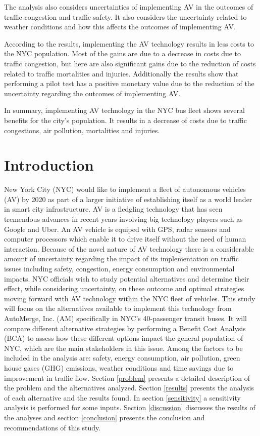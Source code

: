\documentclass[11pt, letterpaper]{article}
\begin{document}
The analysis also considers uncertainties of implementing AV in the outcomes of traffic congestion and
traffic safety. It also considers the uncertainty related to weather conditions and how this affects the outcomes
of implementing AV.

According to the results, implementing the AV technology results in less costs to the NYC population.
Most of the gains are due to a decrease in costs due to traffic congestion, but here are also significant gains 
due to the reduction of costs related to traffic mortalities and injuries. Additionally the results show that 
performing a pilot test has a positive monetary value due to the reduction of the uncertainty regarding the 
outcomes of implementing AV.

In summary, implementing AV technology in the NYC bus fleet shows several benefits for the city's population. It results
in a decrease of costs due to traffic congestions, air pollution, mortalities and injuries.


\pagebreak
\section{Introduction} \label{intro}

New York City (NYC) would like to implement a fleet of autonomous
vehicles (AV) by 2020 as part of a larger initiative of establishing
itself as a world leader in smart city infrastructure. AV is a fledgling technology
that has seen tremendous advances in recent years involving
big technology players such as Google and Uber. An AV vehicle is equiped with
GPS, radar sensors and computer processors which enable it to drive itself without the
need of human interaction. Because of the
novel nature of AV technology there is a considerable amount of
uncertainty regarding the impact of its implementation on traffic
issues including safety, congestion, energy consumption and environmental impacts.
NYC officials wish to study potential alternatives and determine their effect, while
considering uncertainty, on these outcome
and optimal strategies moving forward with AV
technology within the NYC fleet of vehicles. This study will focus on
the alternatives available to implement  this technology
from AutoMerge, Inc. (AM) specifically in NYC's 40-passenger transit
buses. It will compare different alternative strategies by performing
a Benefit Cost Analysis (BCA) to assess how these different options
impact the general population of NYC, which are the main stakeholders
in this issue. Among the factors to be included in the analysis are:
safety, energy consumption, air pollution, green house gases (GHG) emissions, weather
conditions and time savings due to improvement in traffic flow. Section \ref{problem}
presents a detailed description of the problem and the alternatives analyzed. Section
\ref{results} presents the analysis of each alternative and the
results found. In section \ref{sensitivity} a sensitivity analysis is
performed for some inputs. Section \ref{discussion} discusses the
results of the analyses and section \ref{conclusion} presents the
conclusion and recommendations of this study.
\end{document}

